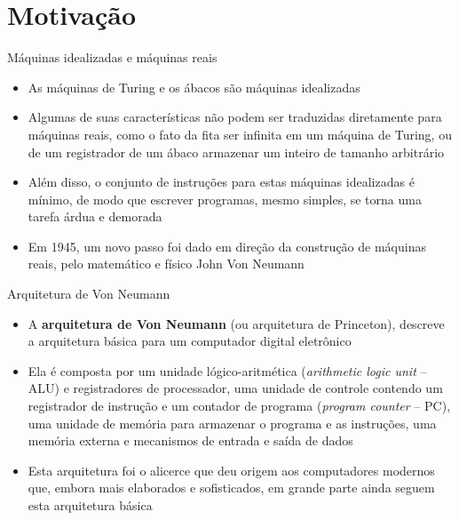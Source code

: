 \section{Motivação}

\begin{frame}[fragile]{Máquinas idealizadas e máquinas reais}

    \begin{itemize}
        \item As máquinas de Turing e os ábacos são máquinas idealizadas

        \item Algumas de suas características não podem ser traduzidas diretamente
            para máquinas reais, como o fato da fita ser infinita em um máquina de Turing, ou
            de um registrador de um ábaco armazenar um inteiro de tamanho arbitrário

        \item Além disso, o conjunto de instruções para estas máquinas idealizadas é mínimo,
            de modo que escrever programas, mesmo simples, se torna uma tarefa árdua e demorada

        \item Em 1945, um novo passo foi dado em direção da construção de máquinas reais, pelo
            matemático e físico John Von Neumann
    \end{itemize}

\end{frame}

\begin{frame}[fragile]{Arquitetura de Von Neumann}

    \begin{itemize}
        \item A \textbf{arquitetura de Von Neumann} (ou arquitetura de Princeton), descreve a 
            arquitetura básica para um computador digital eletrônico

        \item Ela é composta por um unidade lógico-aritmética (\textit{arithmetic logic unit} -- 
            ALU) e registradores de processador,
            uma unidade de controle contendo um registrador de instrução e um contador de 
            programa (\textit{program counter} -- PC), uma unidade de memória para armazenar o 
            programa e as instruções, uma
            memória externa e mecanismos de entrada e saída de dados

        \item Esta arquitetura foi o alicerce que deu origem aos computadores modernos que, 
            embora mais elaborados e sofisticados, em grande parte ainda seguem esta arquitetura
            básica
    \end{itemize}

\end{frame}

